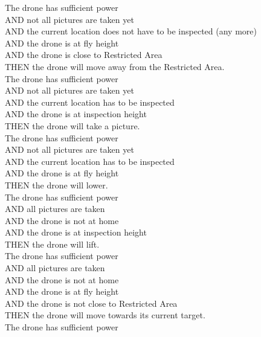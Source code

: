 \documentclass{article}
\begin{document}
The drone has sufficient power\\
\indent AND not all pictures are taken yet\\
\indent AND the current location does not have to be inspected (any more)\\
\indent AND the drone is at fly height\\
\indent AND the drone is close to Restricted Area\\
\indent THEN the drone will move away from the Restricted Area.
\newline\\
The drone has sufficient power\\
\indent AND not all pictures are taken yet\\
\indent AND the current location has to be inspected\\
\indent AND the drone is at inspection height\\
\indent THEN the drone will take a picture.
\newline\\
The drone has sufficient power\\
\indent AND not all pictures are taken yet\\
\indent AND the current location has to be inspected\\
\indent AND the drone is at fly height\\
\indent THEN the drone will lower.
\newline\\
The drone has sufficient power\\
\indent AND all pictures are taken\\
\indent AND the drone is not at home\\
\indent AND the drone is at inspection height\\
\indent THEN the drone will lift.
\newline\\
The drone has sufficient power\\
\indent AND all pictures are taken\\
\indent AND the drone is not at home\\
\indent AND the drone is at fly height\\
\indent AND the drone is not close to Restricted Area\\
\indent THEN the drone will move towards its current target.
\newline\\
The drone has sufficient power\\
\end{document}
